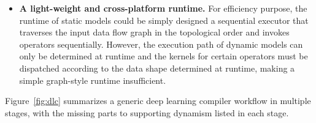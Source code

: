 \begin{itemize}

\item \textbf{A light-weight and cross-platform runtime.} For efficiency purpose, the runtime of static models could be simply designed a sequential executor that traverses the input data flow graph in the topological order and invokes operators sequentially. However, the execution path of dynamic models can only be determined at runtime and the kernels for certain operators must be dispatched according to the data shape determined at runtime, making a simple graph-style runtime insufficient.
\end{itemize}

Figure~\ref{fig:dlc} summarizes a generic deep learning compiler workflow in multiple stages, with the missing parts to supporting dynamism listed in each stage.  %






